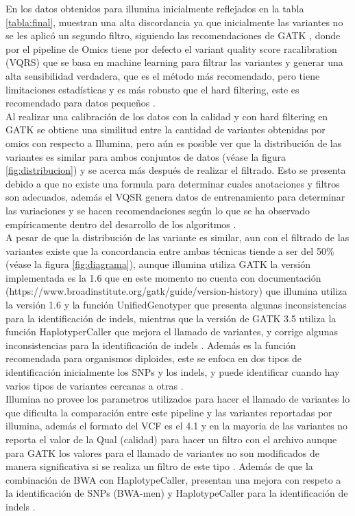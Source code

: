 En los datos obtenidos para illumina inicialmente reflejados en la tabla \ref{tabla:final}, muestran una alta discordancia ya que inicialmente las variantes no se les aplicó un segundo filtro, siguiendo las recomendaciones de  GATK , donde por el pipeline de Omics tiene por defecto el variant quality score racalibration (VQRS) que se basa en machine learning para filtrar las variantes y generar una alta sensibilidad verdadera, que es el método más recomendado, pero tiene limitaciones estadísticas y es más robusto que el hard filtering, este es recomendado para datos pequeños \cite{Auwera2014}. \\

Al realizar una calibración de los datos con la calidad y con hard filtering en GATK se obtiene una similitud entre la cantidad de variantes obtenidas por omics con respecto a Illumina, pero aún es posible ver que la distribución de las variantes es similar para ambos conjuntos de datos (véase la figura \ref{fig:distribucion}) y se acerca más después de realizar el filtrado. Esto se presenta debido a que no existe una formula para determinar cuales anotaciones y filtros son adecuados, además el VQSR genera datos de entrenamiento para determinar las variaciones y se hacen recomendaciones según lo que se ha observado empíricamente dentro del desarrollo de los algoritmos \cite{Auwera2014}. \\

A pesar de que la distribución de las variante es similar, aun con el filtrado de las variantes existe que la concordancia entre ambas técnicas tiende a ser del 50\% (véase la figura \ref{fig:diagrama}), aunque illumina utiliza GATK la versión implementada es la 1.6 que en este momento no cuenta con documentación (https://www.broadinstitute.org/gatk/guide/version-history) que illumina utiliza la versión 1.6 y la función UnifiedGenotyper que presenta algunas inconsistencias para la identificación de indels, mientras que la versión de GATK 3.5 utiliza la función HaplotyperCaller que mejora el llamado de variantes, y corrige algunas inconsistencias para la identificación de indels \cite{ORawe2013}. Además es la función recomendada para organismos diploides, este se enfoca en dos tipos de identificación inicialmente los SNPs y los indels, y puede identificar cuando hay varios tipos de variantes cercanas a otras \cite{Auwera2014}. \\

Illumina no provee los parametros utilizados para hacer el llamado de variantes lo que dificulta la comparación entre este pipeline y las variantes reportadas por illumina, además el formato del VCF es el 4.1 y en la mayoria de las variantes no reporta el valor de la Qual (calidad) para hacer un filtro con el archivo aunque para GATK los valores para el llamado de variantes no son modificados de manera significativa si se realiza un filtro de este tipo \cite{Hwang2015}. Además de que la combinación de BWA con HaplotypeCaller, presentan una mejora con respeto a la identificación de SNPs (BWA-men) y HaplotypeCaller para la identificación de indels \cite{Cornish2015}.

